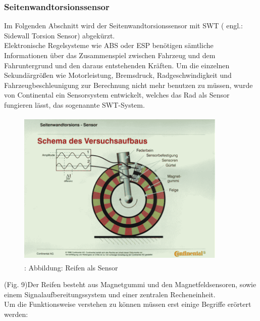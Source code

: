 			\subsubsection{Seitenwandtorsionssensor}
				Im Folgenden Abschnitt wird der Seitenwandtorsionssensor mit SWT ( engl.: Sidewall Torsion Sensor) abgekürzt.\\ 
				Elektronische Regelsysteme wie ABS oder ESP benötigen sämtliche Informationen über das Zusammenspiel zwischen Fahrzeug und dem Fahruntergrund und den daraus entstehenden Kräften. Um die einzelnen Sekundärgrößen wie Motorleistung, Bremsdruck, Radgeschwindigkeit und Fahrzeugbeschleunigung zur Berechnung nicht mehr benutzen zu müssen, wurde von Continental ein Sensorsystem entwickelt, welches das Rad als Sensor fungieren lässt, das sogenannte SWT-System. 
				
				\begin{figure}
					\centering
					\includegraphics[width=10cm, height=7.5cm] {swt1.png}
					\caption {\cite{TS_swt_pic}: Abbildung: Reifen als Sensor}
				\end{figure}
			
				(Fig. 9)Der Reifen besteht aus Magnetgummi und den Magnetfeldsensoren, sowie einem Signalaufbereitungssystem und einer zentralen Recheneinheit.\\
				Um die Funktionsweise verstehen zu können müssen erst einige Begriffe erörtert werden:
				

